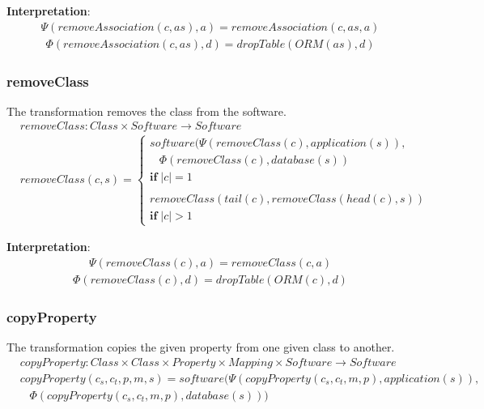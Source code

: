 \documentclass[10pt]{article}
\begin{document}
\noindent \textbf{Interpretation}:
\begin{align}
\Psi(removeAssociation(c, as), a) = removeAssociation(c, as, a)
\end{align}
\begin{align}
\Phi(removeAssociation(c, as), d) = dropTable(ORM(as), d)
\end{align}

\subsubsection{removeClass}
The transformation removes the class from the software.
\begin{align}
& removeClass: Class \times Software \rightarrow Software \nonumber \\
& removeClass(c, s) = \begin{cases}
 software(\Psi(removeClass(c), application(s)), \\
\;\;\; \Phi(removeClass(c), database(s)) \\
\mathbf{if} \; |c| = 1 \\\\
 removeClass(tail(c), removeClass(head(c), s)) \\
\mathbf{if} \; |c| > 1
 \end{cases}
\end{align}

\noindent \textbf{Interpretation}:
\begin{align}
\Psi(removeClass(c), a) = removeClass(c, a)
\end{align}
\begin{align}
\Phi(removeClass(c), d) = dropTable(ORM(c), d)
\end{align}

\subsubsection{copyProperty}
The transformation copies the given property from one given class to another.
\begin{align}
& copyProperty: Class \times Class \times Property \times Mapping \times Software \rightarrow Software \\
& copyProperty(c_s, c_t, p, m, s) = software(\Psi(copyProperty(c_s, c_t, m, p), application(s)), \nonumber \\
& \;\;\; \Phi(copyProperty(c_s, c_t, m, p), database(s)))
\end{align}
\end{document}
